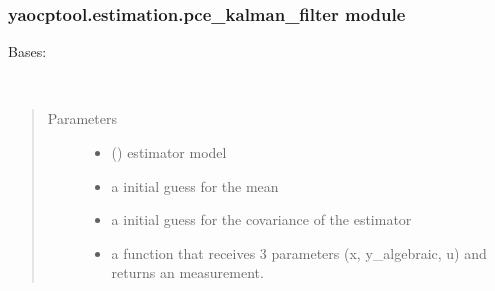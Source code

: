 \documentclass[letterpaper,10pt,english]{sphinxmanual}
\begin{document}
\subsubsection{yaocptool.estimation.pce\_kalman\_filter module}
\label{\detokenize{yaocptool.estimation:module-yaocptool.estimation.pce_kalman_filter}}\label{\detokenize{yaocptool.estimation:yaocptool-estimation-pce-kalman-filter-module}}

\begin{fulllineitems}
\label{\detokenize{yaocptool.estimation:yaocptool.estimation.pce_kalman_filter.PCEKalmanFilter}}
Bases: {\hyperref[\detokenize{yaocptool.estimation:yaocptool.estimation.estimator_abstract.EstimatorAbstract}]{}}

\begin{fulllineitems}
\label{\detokenize{yaocptool.estimation:yaocptool.estimation.pce_kalman_filter.PCEKalmanFilter.__init__}}~\begin{quote}\begin{description}
\item[{Parameters}] \leavevmode\begin{itemize}
\item {} 
 ({\hyperref[\detokenize{yaocptool.modelling:yaocptool.modelling.system_model.SystemModel}]{}}) \textendash{} estimator model

\item {} 
 \textendash{} a initial guess for the mean

\item {} 
 \textendash{} a initial guess for the covariance of the estimator

\item {} 
 \textendash{} a function that receives 3 parameters (x, y\_algebraic, u) and returns an measurement.


\end{itemize}
\end{description}
\end{quote}
\end{fulllineitems}
\end{fulllineitems}
\end{document}
